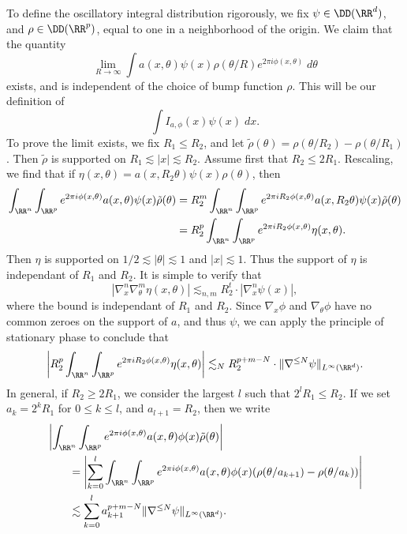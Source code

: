 To define the oscillatory integral distribution rigorously, we fix $\psi \in \DD(\RR^d)$, and $\rho \in \DD(\RR^p)$, equal to one in a neighborhood of the origin. We claim that the quantity
%
\[ \lim_{R \to \infty} \int a(x,\theta) \psi(x) \rho(\theta / R) e^{2 \pi i \phi(x,\theta)}\; d\theta \]
%
exists, and is independent of the choice of bump function $\rho$. This will be our definition of
%
\[ \int I_{a,\phi}(x) \psi(x)\; dx. \]
%
To prove the limit exists, we fix $R_1 \leq R_2$, and let $\tilde{\rho}(\theta) = \rho(\theta/R_2) - \rho(\theta/R_1)$. Then $\tilde{\rho}$ is supported on $R_1 \lesssim |x| \lesssim R_2$. Assume first that $R_2 \leq 2R_1$. Rescaling, we find that if $\eta(x,\theta) = a(x,R_2 \theta) \psi(x) \rho(\theta)$, then
%
\begin{align*}
    \int_{\RR^n} \int_{\RR^p} e^{2 \pi i \phi(x,\theta)} a(x,\theta) \psi(x) \tilde{\rho}(\theta) &= R_2^m \int_{\RR^n} \int_{\RR^p} e^{2 \pi i R_2 \phi(x,\theta)} a(x,R_2 \theta) \psi(x) \tilde{\rho}(\theta)\\
    &= R_2^p \int_{\RR^n} \int_{\RR^p} e^{2 \pi i R_2 \phi(x,\theta)} \eta(x,\theta).
\end{align*}
%
Then $\eta$ is supported on $1/2 \lesssim |\theta| \lesssim 1$ and $|x| \lesssim 1$. Thus the support of $\eta$ is independant of $R_1$ and $R_2$. It is simple to verify that
%
\[ |\nabla^n_x \nabla^m_\theta \eta(x,\theta)| \lesssim_{n,m} R_2^t \cdot |\nabla^n_x \psi(x)|, \]
%
where the bound is independant of $R_1$ and $R_2$. Since $\nabla_x \phi$ and $\nabla_\theta \phi$ have no common zeroes on the support of $a$, and thus $\psi$, we can apply the principle of stationary phase to conclude that
%
\[ \left| R_2^p \int_{\RR^n} \int_{\RR^p} e^{2 \pi i R_2 \phi(x,\theta)} \eta(x,\theta) \right| \lesssim_N R_2^{p + m - N} \cdot \| \nabla^{\leq N} \psi \|_{L^\infty(\RR^d)}. \]
%
In general, if $R_2 \geq 2R_1$, we consider the largest $l$ such that $2^l R_1 \leq R_2$. If we set $a_k = 2^k R_1$ for $0 \leq k \leq l$, and $a_{l+1} = R_2$, then we write
%
\begin{align*}
    &\left| \int_{\RR^n} \int_{\RR^p} e^{2 \pi i \phi(x,\theta)} a(x,\theta) \phi(x) \tilde{\rho}(\theta) \right|\\
    &\quad\quad= \left| \sum_{k = 0}^l \int_{\RR^n} \int_{\RR^p} e^{2 \pi i \phi(x,\theta)} a(x,\theta) \phi(x) (\rho(\theta/a_{k+1}) - \rho(\theta / a_k)) \right|\\
    &\quad\quad\lesssim \sum_{k = 0}^l a_{k+1}^{p + m - N} \| \nabla^{\leq N} \psi \|_{L^\infty(\RR^d)}. 
\end{align*}
